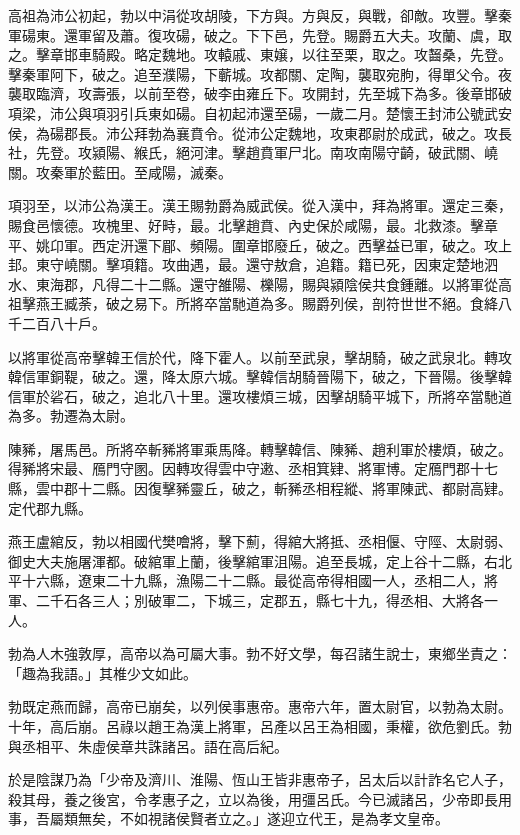 \begin{pinyinscope}
高祖為沛公初起，勃以中涓從攻胡陵，下方與。方與反，與戰，卻敵。攻豐。擊秦軍碭東。還軍留及蕭。復攻碭，破之。下下邑，先登。賜爵五大夫。攻蘭、虞，取之。擊章邯車騎殿。略定魏地。攻轅戚、東嬢，以往至栗，取之。攻齧桑，先登。擊秦軍阿下，破之。追至濮陽，下蘄城。攻都關、定陶，襲取宛朐，得單父令。夜襲取臨濟，攻壽張，以前至卷，破李由雍丘下。攻開封，先至城下為多。後章邯破項梁，沛公與項羽引兵東如碭。自初起沛還至碭，一歲二月。楚懷王封沛公號武安侯，為碭郡長。沛公拜勃為襄賁令。從沛公定魏地，攻東郡尉於成武，破之。攻長社，先登。攻潁陽、緱氏，絕河津。擊趙賁軍尸北。南攻南陽守齮，破武關、嶢關。攻秦軍於藍田。至咸陽，滅秦。

項羽至，以沛公為漢王。漢王賜勃爵為威武侯。從入漢中，拜為將軍。還定三秦，賜食邑懷德。攻槐里、好畤，最。北擊趙賁、內史保於咸陽，最。北救漆。擊章平、姚卬軍。西定汧還下郿、頻陽。圍章邯廢丘，破之。西擊益已軍，破之。攻上邽。東守嶢關。擊項籍。攻曲遇，最。還守敖倉，追籍。籍已死，因東定楚地泗水、東海郡，凡得二十二縣。還守雒陽、櫟陽，賜與潁陰侯共食鍾離。以將軍從高祖擊燕王臧荼，破之易下。所將卒當馳道為多。賜爵列侯，剖符世世不絕。食絳八千二百八十戶。

以將軍從高帝擊韓王信於代，降下霍人。以前至武泉，擊胡騎，破之武泉北。轉攻韓信軍銅鞮，破之。還，降太原六城。擊韓信胡騎晉陽下，破之，下晉陽。後擊韓信軍於硰石，破之，追北八十里。還攻樓煩三城，因擊胡騎平城下，所將卒當馳道為多。勃遷為太尉。

陳豨，屠馬邑。所將卒斬豨將軍乘馬降。轉擊韓信、陳豨、趙利軍於樓煩，破之。得豨將宋最、鴈門守圂。因轉攻得雲中守遫、丞相箕肄、將軍博。定鴈門郡十七縣，雲中郡十二縣。因復擊豨靈丘，破之，斬豨丞相程縱、將軍陳武、都尉高肄。定代郡九縣。

燕王盧綰反，勃以相國代樊噲將，擊下薊，得綰大將抵、丞相偃、守陘、太尉弱、御史大夫施屠渾都。破綰軍上蘭，後擊綰軍沮陽。追至長城，定上谷十二縣，右北平十六縣，遼東二十九縣，漁陽二十二縣。最從高帝得相國一人，丞相二人，將軍、二千石各三人；別破軍二，下城三，定郡五，縣七十九，得丞相、大將各一人。

勃為人木強敦厚，高帝以為可屬大事。勃不好文學，每召諸生說士，東鄉坐責之：「趣為我語。」其椎少文如此。

勃既定燕而歸，高帝已崩矣，以列侯事惠帝。惠帝六年，置太尉官，以勃為太尉。十年，高后崩。呂祿以趙王為漢上將軍，呂產以呂王為相國，秉權，欲危劉氏。勃與丞相平、朱虛侯章共誅諸呂。語在高后紀。

於是陰謀乃為「少帝及濟川、淮陽、恆山王皆非惠帝子，呂太后以計詐名它人子，殺其母，養之後宮，令孝惠子之，立以為後，用彊呂氏。今已滅諸呂，少帝即長用事，吾屬類無矣，不如視諸侯賢者立之。」遂迎立代王，是為孝文皇帝。


\end{pinyinscope}

